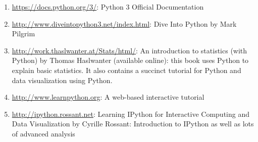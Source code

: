 \documentclass[11pt,article,oneside]{memoir} %
\begin{document}
\begin{enumerate}%

\item \url{https://docs.python.org/3/}: Python 3 Official Documentation

\item \url{http://www.diveintopython3.net/index.html}: Dive Into Python by Mark Pilgrim 

\item \url{http://work.thaslwanter.at/Stats/html/}: An introduction to statistics (with Python) by Thomas Haslwanter (available online): this book uses Python to explain basic statistics. It also contains a succinct tutorial for Python and data visualization using Python. 

\item \url{http://www.learnpython.org}: A web-based interactive tutorial 

\item \url{http://ipython.rossant.net}: Learning IPython for Interactive Computing and Data Visualization by Cyrille Rossant: Introduction to IPython as well as lots of advanced analysis 

\end{enumerate}%





\end{document}
